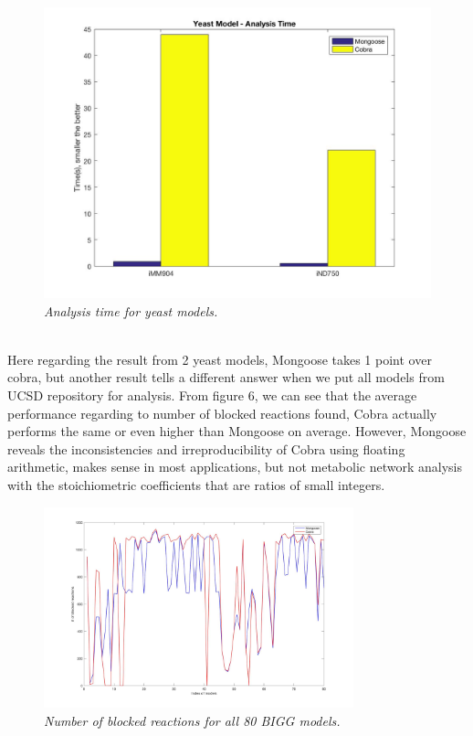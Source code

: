 \documentclass[11pt, a4paper]{article}
\begin{document}
	\begin{figure}[H]
  		\centering
      	\includegraphics[width=1\textwidth]{yeast_time.jpg}
      	\caption{\textit{Analysis time for yeast models.}}
	\end{figure}
	~\\Here regarding the result from 2 yeast models, Mongoose takes 1 point over cobra, but another result tells a different answer when we put all models from UCSD repository for analysis. From figure 6, we can see that the average performance regarding to number of blocked reactions found, Cobra actually performs the same or even higher than Mongoose on average.
However, Mongoose reveals the inconsistencies and irreproducibility of Cobra using floating arithmetic, makes sense in most applications, but not metabolic network analysis with the stoichiometric coefficients that are ratios of small integers.\\
	\begin{figure}[H]
  		\centering
      	\includegraphics[width=0.8\textwidth]{all_model_rxn.jpg}
      	\caption{\textit{Number of blocked reactions for all 80 BIGG models.}}
	\end{figure}
\end{document}
